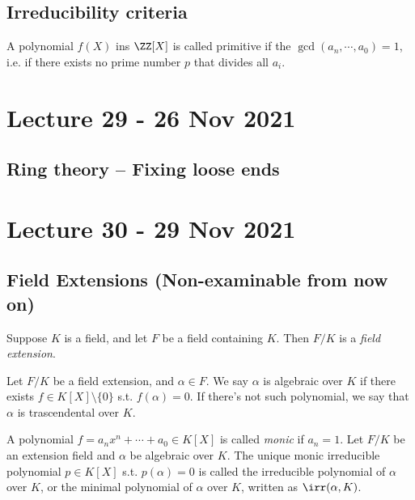 \documentclass[11pt]{scrartcl}
\begin{document}
\subsection{Irreducibility criteria}

\begin{definition}
  A polynomial $f(X)$ ins $\ZZ[X]$ is called primitive if the $\gcd(a_n,\cdots,a_0)=1$,
  i.e. if there exists no prime number $p$ that divides all $a_i$.
  \label{def:primitivePol}
\end{definition}

\section{Lecture 29 - 26 Nov 2021}

\subsection{Ring theory -- Fixing loose ends}

\section{Lecture 30 - 29 Nov 2021}

\subsection{Field Extensions (Non-examinable from now on)}

\begin{definition}
  Suppose $K$ is a field, and let $F$ be a field containing $K$. Then $F/K$ is a
  \emph{field extension}.
  \label{def:fieldExt}
\end{definition}

\begin{definition}
  Let $F/K$ be a field extension, and $\alpha\in F$. We say $\alpha$ is algebraic over
  $K$ if there exists $f\in K[X]\setminus \{0\}$ s.t. $f(\alpha)=0$. If there's not such
  polynomial, we say that $\alpha$ is trascendental over $K$.
\end{definition}

\begin{definition}
  A polynomial $f=a_nx^n+\cdots+a_0\in K[X]$ is called \emph{monic} if $a_n=1$.
  Let $F/K$ be an extension field and $\alpha$ be algebraic over $K$. The unique monic
  irreducible polynomial $p\in K[X]$ s.t. $p(\alpha)=0$ is called the irreducible
  polynomial of $\alpha$ over $K$, or the minimal polynomial of $\alpha$ over $K$, written
  as $\irr (\alpha, K)$.
\end{definition}
\end{document}
